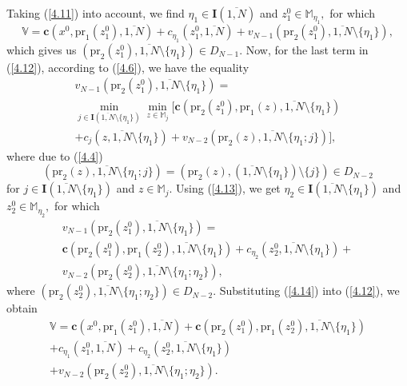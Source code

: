 \documentclass[numbers,sort&compress]{IntechOpen-Book}%
\begin{document}
Taking (\ref{4.11}) into account, we find
$\eta_1 \in \mathbf{I}(\overline{1,N})$ and $z_1^0 \in \mathbb{M}_{\eta_1},$
for which
\begin{equation}\label{4.12}
  \mathbb{V} = \mathbf{c}(x^0,\mathrm{pr}_1(z_1^0),\overline{1,N}) +
  c_{\eta_1}(z_1^0,\overline{1,N}) +
  v_{N-1}(\mathrm{pr}_2(z_1^0),\overline{1,N} \setminus \{\eta_1\}),
\end{equation}
which gives us
$(\mathrm{pr}_2(z_1^0),\overline{1,N} \setminus \{\eta_1\}) \in D_{N-1}$.
Now,
for the last term in (\ref{4.12}),
according to (\ref{4.6}),
we have the equality
\begin{multline}
  \label{4.13}
  v_{N-1}(\mathrm{pr}_2(z_1^0),\overline{1,N}  \setminus \{\eta_1\}) =
  \\
  \min\limits_{j \in \mathbf{I}(\overline{1,N} \setminus \{\eta_1\})}
  \min\limits_{z \in \mathbb{M}_j}
  \big [
    \mathbf{c}(\mathrm{pr}_2(z_1^0),\mathrm{pr}_1(z),\overline{1,N} \setminus \{\eta_1\})
    \\
    + c_j(z,\overline{1,N} \setminus \{\eta_1\}) +
    v_{N-2}(\mathrm{pr}_2(z),\overline{1,N} \setminus \{\eta_1;j\})
  \big ],
\end{multline}
where due to
 (\ref{4.4})
$$
(\mathrm{pr}_2(z),\overline{1,N} \setminus \{\eta_1;j\}) =
(\mathrm{pr}_2(z),(\overline{1,N} \setminus \{\eta_1\}) \setminus \{j\}) \in D_{N-2}
$$
for
$j \in \mathbf{I}(\overline{1,N} \setminus \{\eta_1\})$ and $z \in \mathbb{M}_j.$
Using (\ref{4.13}),
we get
$\eta_2 \in \mathbf{I}(\overline{1,N} \setminus \{\eta_1\})$ and $z_2^0 \in \mathbb{M}_{\eta_2},$
for which
\begin{multline}
  \label{4.14}
  v_{N-1}(\mathrm{pr}_2(z_1^0),\overline{1,N} \setminus \{\eta_1\}) =
  \\
  \mathbf{c}(\mathrm{pr}_2(z_1^0),\mathrm{pr}_1(z_2^0),\overline{1,N}
  \setminus \{\eta_1\}) + c_{\eta_2}(z_2^0,\overline{1,N}
  \setminus \{\eta_1\})
  + \\
  v_{N-2}(\mathrm{pr}_2(z_2^0),\overline{1,N} \setminus
  \{\eta_1;\eta_2\}),
\end{multline}
where
$(\mathrm{pr}_2(z_2^0),\overline{1,N} \setminus \{\eta_1;\eta_2\}) \in D_{N-2}.$
Substituting (\ref{4.14}) into (\ref{4.12}), we obtain
\begin{equation}\label{4.15}
  \begin{array}{c}
    \mathbb{V} =
    \mathbf{c}(x^0,\mathrm{pr}_1(z_1^0),\overline{1,N}) +
    \mathbf{c}(\mathrm{pr}_2(z_1^0),\mathrm{pr}_1(z_2^0),\overline{1,N} \setminus \{\eta_1\})\\
    + c_{\eta_1}(z_1^0,\overline{1,N}) + c_{\eta_2}(z_2^0,\overline{1,N} \setminus \{\eta_1\})
    \\
    + v_{N-2}(\mathrm{pr}_2(z_2^0),\overline{1,N} \setminus \{\eta_1;\eta_2\}).
  \end{array}
\end{equation}
\end{document}

